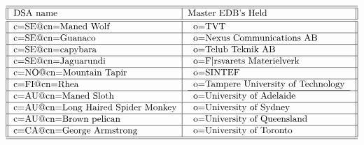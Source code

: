 \begin{table}
\caption{Other DSAs at the Country Level}
\small
\[
\begin{tabular}{||l|l||} \hline\hline
DSA name 		& Master EDB's Held \\ \hline\hline	
c=SE@cn=Maned Wolf	&\begin{tabular}{l}
			o=TVT \\
			\end{tabular}\\ \hline
c=SE@cn=Guanaco		&\begin{tabular}{l}
			o=Nexus Communications AB \\
			\end{tabular}\\ \hline
c=SE@cn=capybara
           &\begin{tabular}{l}
           o=Telub Teknik AB \\
           \end{tabular}\\ \hline
c=SE@cn=Jaguarundi
           &\begin{tabular}{l}
	   o=F|rsvarets Materielverk \\
           \end{tabular}\\ \hline
c=NO@cn=Mountain Tapir	&\begin{tabular}{l}
			o=SINTEF \\
			\end{tabular}\\ \hline
c=FI@cn=Rhea		&\begin{tabular}{l}
			o=Tampere University of Technology \\ \hline
			\end{tabular}\\ \hline
c=AU@cn=Maned Sloth
           &\begin{tabular}{l}
           o=University of Adelaide \\
           \end{tabular}\\ \hline
c=AU@cn=Long Haired Spider Monkey
           &\begin{tabular}{l}
           o=University of Sydney \\
           \end{tabular}\\ \hline
c=AU@cn=Brown pelican
           &\begin{tabular}{l}
           o=University of Queensland \\
           \end{tabular}\\ \hline
c=CA@cn=George Armstrong
           &\begin{tabular}{l}
           o=University of Toronto \\
           \end{tabular}\\ \hline
\hline
\end{tabular}
\]
\end{table}
